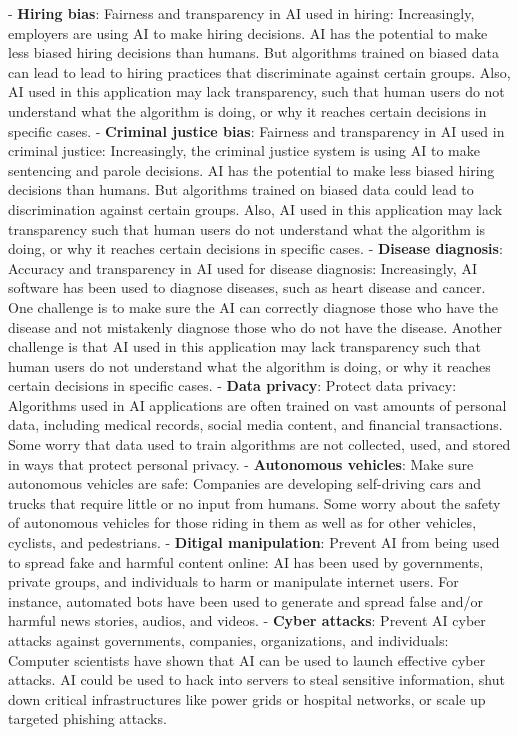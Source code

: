 \documentclass{article}
\begin{document}
-  \textbf{Hiring bias}: Fairness and transparency in AI used in hiring: Increasingly, employers are using AI to make hiring decisions. AI has the potential to make less biased hiring decisions than humans. But algorithms trained on biased data can lead to lead to hiring practices that discriminate against certain groups. Also, AI used in this application may lack transparency, such that human users do not understand what the algorithm is doing, or why it reaches certain decisions in specific cases.
-  \textbf{Criminal justice bias}: Fairness and transparency in AI used in criminal justice: Increasingly, the criminal justice system is using AI to make sentencing and parole decisions. AI has the potential to make less biased hiring decisions than humans. But algorithms trained on biased data could lead to discrimination against certain groups. Also, AI used in this application may lack transparency such that human users do not understand what the algorithm is doing, or why it reaches certain decisions in specific cases.
-  \textbf{Disease diagnosis}: Accuracy and transparency in AI used for disease diagnosis: Increasingly, AI software has been used to diagnose diseases, such as heart disease and cancer. One challenge is to make sure the AI can correctly diagnose those who have the disease and not mistakenly diagnose those who do not have the disease. Another challenge is that AI used in this application may lack transparency such that human users do not understand what the algorithm is doing, or why it reaches certain decisions in specific cases.
-  \textbf{Data privacy}: Protect data privacy: Algorithms used in AI applications are often trained on vast amounts of personal data, including medical records, social media content, and financial transactions. Some worry that data used to train algorithms are not collected, used, and stored in ways that protect personal privacy.
-  \textbf{Autonomous vehicles}: Make sure autonomous vehicles are safe: Companies are developing self-driving cars and trucks that require little or no input from humans. Some worry about the safety of autonomous vehicles for those riding in them as well as for other vehicles, cyclists, and pedestrians.
-  \textbf{Ditigal manipulation}: Prevent AI from being used to spread fake and harmful content online: AI has been used by governments, private groups, and individuals to harm or manipulate internet users. For instance, automated bots have been used to generate and spread false and/or harmful news stories, audios, and videos.
-  \textbf{Cyber attacks}: Prevent AI cyber attacks against governments, companies, organizations, and individuals: Computer scientists have shown that AI can be used to launch effective cyber attacks. AI could be used to hack into servers to steal sensitive information, shut down critical infrastructures like power grids or hospital networks, or scale up targeted phishing attacks.
\end{document}
